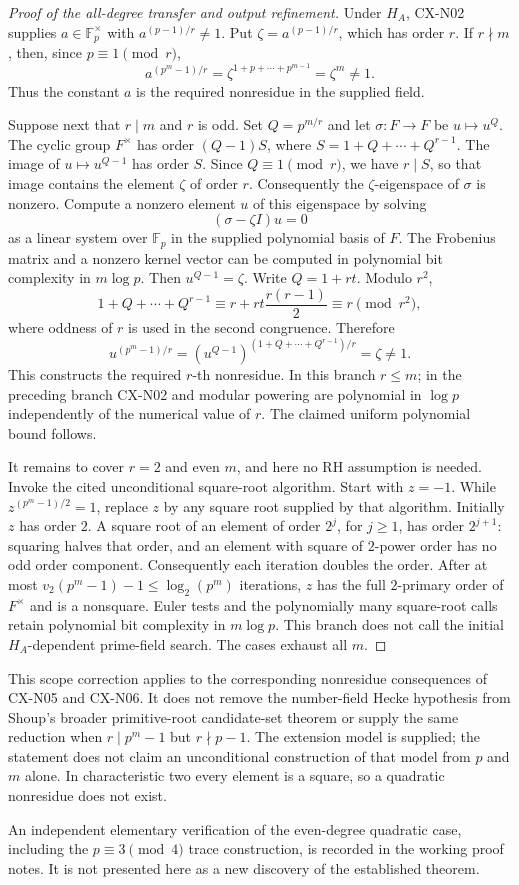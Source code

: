 \begin{proof}[Proof of the all-degree transfer and output refinement]
Under $H_A$, CX-N02 supplies $a\in\mathbb F_p^\times$ with
$a^{(p-1)/r}\ne1$. Put $\zeta=a^{(p-1)/r}$, which has order $r$.
If $r\nmid m$, then, since $p\equiv1\pmod r$,
\[
 a^{(p^m-1)/r}
 =\zeta^{1+p+\cdots+p^{m-1}}
 =\zeta^m\ne1.
\]
Thus the constant $a$ is the required nonresidue in the supplied field.

Suppose next that $r\mid m$ and $r$ is odd. Set $Q=p^{m/r}$ and let
$\sigma:F\longrightarrow F$ be $u\longmapsto u^Q$.
The cyclic group $F^\times$ has order $(Q-1)S$, where
$S=1+Q+\cdots+Q^{r-1}$. The image of $u\mapsto u^{Q-1}$
has order $S$. Since $Q\equiv1\pmod r$, we have $r\mid S$,
so that image contains the element $\zeta$ of order $r$.
Consequently the $\zeta$-eigenspace of $\sigma$ is nonzero.
Compute a nonzero element $u$ of this eigenspace by solving
\[
 (\sigma-\zeta I)u=0
\]
as a linear system over $\mathbb F_p$ in the supplied polynomial
basis of $F$. The Frobenius matrix and a nonzero kernel vector can
be computed in polynomial bit complexity in $m\log p$.
Then $u^{Q-1}=\zeta$. Write $Q=1+rt$. Modulo $r^2$,
\[
 1+Q+\cdots+Q^{r-1}
 \equiv r+rt\frac{r(r-1)}2\equiv r\pmod{r^2},
\]
where oddness of $r$ is used in the second congruence. Therefore
\[
 u^{(p^m-1)/r}
 =\left(u^{Q-1}\right)^{(1+Q+\cdots+Q^{r-1})/r}
 =\zeta\ne1.
\]
This constructs the required $r$-th nonresidue. In this branch
$r\le m$; in the preceding branch CX-N02 and modular powering
are polynomial in $\log p$ independently of the numerical value
of $r$. The claimed uniform polynomial bound follows.

It remains to cover $r=2$ and even $m$, and here no RH assumption
is needed. Invoke the cited unconditional square-root algorithm.
Start with $z=-1$. While $z^{(p^m-1)/2}=1$, replace $z$ by any
square root supplied by that algorithm. Initially $z$ has order $2$.
A square root of an element of order $2^j$, for $j\ge1$, has order
$2^{j+1}$: squaring halves that order, and an element with square
of $2$-power order has no odd order component. Consequently each
iteration doubles the order. After at most
$v_2(p^m-1)-1\le\log_2(p^m)$ iterations, $z$ has the full
$2$-primary order of $F^\times$ and is a nonsquare. Euler tests and
the polynomially many square-root calls retain polynomial bit
complexity in $m\log p$. This branch does not call the initial
$H_A$-dependent prime-field search. The cases exhaust all $m$.
\end{proof}

This scope correction applies to the corresponding nonresidue
consequences of CX-N05 and CX-N06. It does not remove the
number-field Hecke hypothesis from Shoup's broader primitive-root
candidate-set theorem or supply the same reduction when
$r\mid p^m-1$ but $r\nmid p-1$. The extension model is supplied;
the statement does not claim an unconditional construction of that
model from $p$ and $m$ alone. In characteristic two every element
is a square, so a quadratic nonresidue does not exist.

An independent elementary verification of the even-degree quadratic
case, including the $p\equiv3\pmod4$ trace construction, is recorded
in the working proof notes. It is not presented here as a new
discovery of the established theorem.
